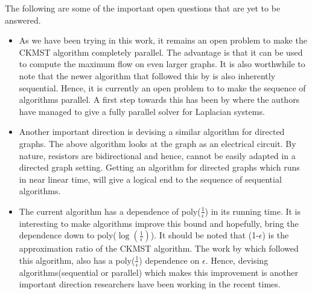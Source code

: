 \documentclass[BTech]{iitmdiss}
\begin{document}
		 The following are some of the important open questions that are yet to be answered.
		 \begin{itemize}
		  \item 
		    As we have been trying in this work, it remains an open problem to make the CKMST algorithm completely parallel.
		    The advantage is that it can be used to compute the maximum flow on even larger graphs. It is also worthwhile to note that 
		 the newer algorithm that followed this by \cite{DBLP:journals/corr/abs-1304-2338} is also inherently sequential. Hence, it is currently an open problem to
		 to make the sequence of algorithms parallel. A first step towards this has been by \cite{DBLP:journals/corr/PengS13} where the authors have managed
		 to give a fully parallel solver for Laplacian systems. \\
		 
		 \item
		    Another important direction is devising a similar algorithm for directed graphs. The above algorithm looks at the graph as an electrical
		 circuit. By nature, resistors are bidirectional and hence, cannot be easily adapted in a directed graph setting. Getting an algorithm 
		 for directed graphs which runs in near linear time, will give a logical end to the sequence of sequential algorithms. \\
		 
		 \item
		    The current algorithm has a dependence of poly($\frac{1}{\epsilon}$) in its running time. It is interesting to make algorithms 
		 improve this bound and hopefully, bring the dependence down to poly($\log (\frac{1}{\epsilon})$). It should be noted that (1-$\epsilon$) is the approximation
		 ratio of the CKMST algorithm. The work by \cite{DBLP:journals/corr/abs-1304-2338} which followed this algorithm, also has a poly($\frac{1}{\epsilon}$)
		 dependence on $\epsilon$. Hence, devising algorithms(sequential or parallel) which makes this improvement is another important
		 direction researchers have been working in the recent times.
		 \end{itemize}
		 
		 
		
\pagebreak
\begin{singlespace}
  \begin{small}
	
  \end{small}
\end{singlespace}

\end{document}
